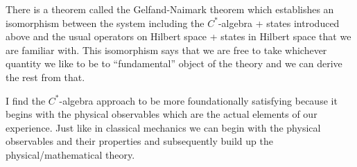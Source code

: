 \documentclass[12pt]{article}
\begin{document}
There is a theorem called the Gelfand-Naimark theorem which establishes an isomorphism between the system including the $C^*$-algebra + states introduced above and the usual operators on Hilbert space + states in Hilbert space that we are familiar with. This isomorphism says that we are free to take whichever quantity we like to be to ``fundamental'' object of the theory and we can derive the rest from that.

I find the $C^*$-algebra approach to be more foundationally satisfying because it begins with the physical observables which are the actual elements of our experience. Just like in classical mechanics we can begin with the physical observables and their properties and subsequently  build up the physical/mathematical theory.
\end{document}
